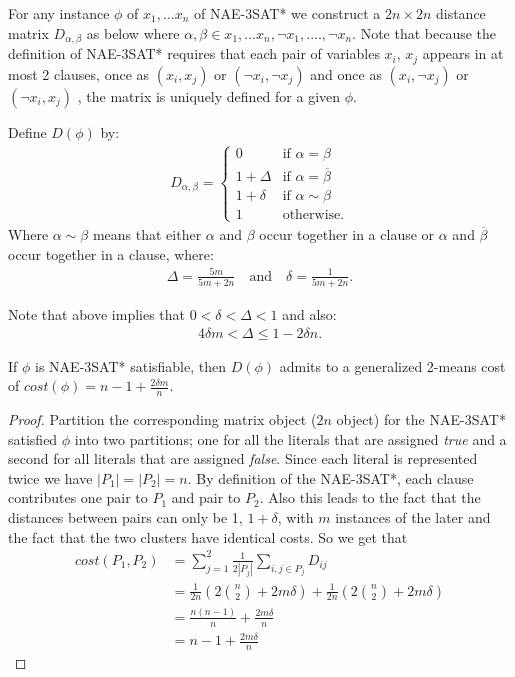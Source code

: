 For any instance $\phi$ of $x_1,...x_n$ of NAE-3SAT* we construct a
$2n \times 2n$ distance matrix $D_{\alpha,\beta}$ as below where
$\alpha,\beta \in x_1,...x_n, \neg x_1,....,\neg x_n$.  Note that
because the definition of NAE-3SAT* requires that each pair of
variables $x_i$, $x_j$ appears in at most 2 clauses, once as
$(x_i,x_j)$ or $(\neg x_i, \neg x_j)$ and once as  $(x_i,\neg x_j)$ or
$(\neg x_i, x_j)$ , the matrix is uniquely defined for a given
$\phi$. 
\begin{definition} \label{2-means-distance-matrix} Define
  $D(\phi)$ by:
\begin{align}
  D_{\alpha,\beta} = \begin{cases}
    0 & \textrm{if } \alpha = \beta\\
    1+\Delta  & \mbox{if } \alpha = \overline{\beta} \\
    1+\delta  & \mbox{if } \alpha \sim \beta \\
    1 & \textrm{otherwise}.
  \end{cases}
\end{align}
Where $ \alpha \sim \beta$ means that either $\alpha$ and $\beta$
occur together in a clause or $\alpha$ and $\overline{\beta} $ occur
together in a clause, where:
\begin{align}
  \Delta = \frac{5m}{5m + 2n} \quad\textrm{and}
  \quad\delta = \frac{1}{5m  + 2n}.
\end{align}
\end{definition}
Note that above implies that $0 < \delta < \Delta < 1$ and also:
\begin{align}
4 \delta m < \Delta \le 1 - 2 \delta n.
\end{align}

\begin{lemma} \label{generalized-2-means-cost}
If $\phi$ is NAE-3SAT* satisfiable, then $D(\phi)$ admits to a
generalized 2-means cost of $cost(\phi) = n - 1 + \frac{2\delta
  m}{n}$. 
\end{lemma}

\begin{proof}
Partition the corresponding matrix object ($2n$ object) for the
NAE-3SAT* satisfied $\phi$ into two partitions; one for all the
literals that are assigned \textit{true} and a second for all literals
that are assigned \textit{false}.  Since each literal is represented
twice we have $|P_1| = |P_2| = n$.   By definition of the NAE-3SAT*,
each clause contributes one pair to $P_1$ and pair to $P_2$.   Also
this leads to the fact that the distances between pairs can only be 1,
$1+\delta$, with $m$ instances of the later and the fact that the two
clusters have identical costs. So we get that 
\begin{align*}
cost(P_1,P_2) &= \sum_{j=1}^{2} \frac{1}{2|P_j|} \sum_{i,j \in P_j}
D_{ij}\\ 
&= \frac{1}{2n}( 2 {n \choose 2} + 2m\delta ) + \frac{1}{2n}( 2 {n
  \choose 2} + 2m\delta ) \\ 
&= \frac{ n (n-1) } {n} + \frac{2 m \delta}{n} \\
&= n - 1 +  \frac{2 m \delta}{n}
\end{align*}
\end{proof}

